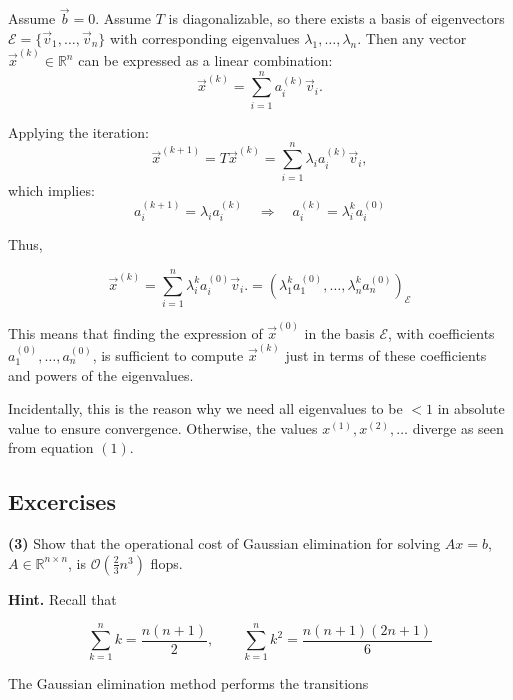 \documentclass[12pt]{article}
\theoremstyle{definition}
\begin{document}
Assume $\overrightarrow{b} = 0$. Assume \( T \) is diagonalizable, so there
exists a basis of eigenvectors \( \mathcal{E} = \{\vec{v}_1, \dots, \vec{v}_n\}
\) with corresponding eigenvalues \( \lambda_1, \dots, \lambda_n \). Then any
vector \( \vec{x}^{(k)} \in \mathbb{R}^n \) can be expressed as a linear
combination:
\[
\vec{x}^{(k)} = \sum_{i=1}^n a_i^{(k)} \vec{v}_i.
\]

Applying the iteration:
\[
\vec{x}^{(k+1)} = T \vec{x}^{(k)} = \sum_{i=1}^n \lambda_i a_i^{(k)} \vec{v}_i,
\]
which implies:
\[
a_i^{(k+1)} = \lambda_i a_i^{(k)} \quad \Rightarrow \quad a_i^{(k)} =
\lambda_i^k a_i^{(0)} 
\]

Thus,

\begin{equation}
\vec{x}^{(k)} = \sum_{i=1}^n \lambda_i^k a_i^{(0)} \vec{v}_i.
= (\lambda_1^k a_1^{(0)}, \ldots, \lambda_{n}^{k}
a_n^{(0)})_{\mathcal{E}}
\end{equation}

This means that finding the expression of $\overrightarrow{x}^{(0)}$ in the
basis $\mathcal{E}$, with coefficients $a_1^{(0)}, \ldots, a_n^{(0)}$, is
sufficient to compute $\overrightarrow{x}^{(k)}$ just in terms of these
coefficients and powers of the eigenvalues.

Incidentally, this is the reason why we need all eigenvalues to be $<1$ in
absolute value to ensure convergence. Otherwise, the values $x^{(1)}, x^{(2)},
\ldots$ diverge as seen from equation $(1)$.

\pagebreak 

\subsection{Excercises}

\begin{shaded}
    \textbf{(3)} Show that the operational cost of Gaussian elimination for
    solving $Ax = b$, $A \in \mathbb{R}^{n \times n}$, is $\mathcal{O}\left(
    \frac{2}{3}n^3 \right) $ flops. 

    \textbf{Hint.} Recall that 

    \begin{equation*}
        \sum_{k=1}^n k = \frac{n(n+1)}{2}, \qquad \sum_{k=1}^n k^2 =
        \frac{n(n+1)(2n+1)}{6}
    \end{equation*}
\end{shaded}

The Gaussian elimination method performs the transitions 
\end{document}
